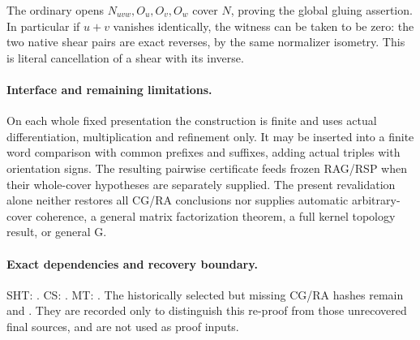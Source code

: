 The ordinary opens $N_{uvw},O_u,O_v,O_w$ cover $N$, proving the
global gluing assertion.  In particular if $u+v$ vanishes identically,
the witness can be taken to be zero: the two native shear pairs
are exact reverses, by the same normalizer isometry.  This is
literal cancellation of a shear with its inverse.

\paragraph{Interface and remaining limitations.}
On each whole fixed presentation the construction is finite and
uses actual differentiation, multiplication and refinement only.
It may be inserted into a finite word comparison with common
prefixes and suffixes, adding actual triples with orientation signs.
The resulting pairwise certificate feeds frozen RAG/RSP when their
whole-cover hypotheses are separately supplied.  The present
revalidation alone neither restores all CG/RA conclusions nor
supplies automatic arbitrary-cover coherence, a general matrix
factorization theorem, a full kernel topology result, or general G.

\paragraph{Exact dependencies and recovery boundary.}
SHT: .
CS: .
MT: .
The historically selected but missing CG/RA hashes remain
and .
They are recorded only to distinguish this re-proof from those
unrecovered final sources, and are not used as proof inputs.
